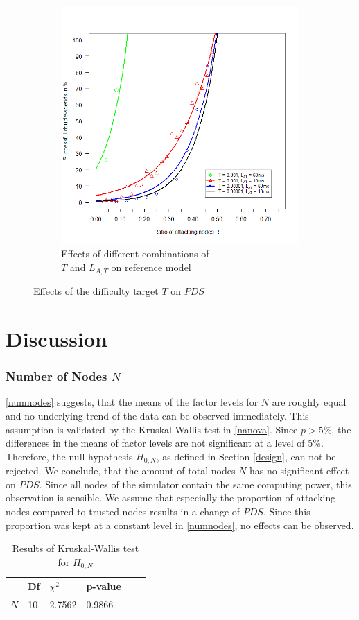 \documentclass[a4paper,12pt,twoside]{report}
\begin{document}
\begin{figure}[hb!]
\begin{subfigure}{.5\textwidth}
  \includegraphics[width=\linewidth]{Experiments/Difficulty/diffrat.png}
  \caption{Effects of different combinations of \\ $T$ and $L_{A,T}$ on reference model}
  \label{diff:b}
\end{subfigure}
\caption{Effects of the difficulty target $T$ on $PDS$}
\label{diff}
\end{figure}

\section{Discussion}
\subsubsection{Number of Nodes $N$}
\autoref{numnodes} suggests, that the means of the factor levels for $N$ are roughly equal and no underlying trend of the data can be observed immediately. This assumption is validated by the Kruskal-Wallis test in \autoref{nanova}. Since $p > 5\%$, the differences in the means of factor levels are not significant at a level of 5\%. Therefore, the null hypothesis $H_{0,N}$, as defined in Section \ref{design}, can not be rejected. We conclude, that the amount of total nodes $N$ has no significant effect on $PDS$. Since all nodes of the simulator contain the same computing power, this observation is sensible. We assume that especially the proportion of attacking nodes compared to trusted nodes results in a change of $PDS$. Since this proportion was kept at a constant level in \autoref{numnodes}, no effects can be observed.
\begin{table}[hb]
\centering
\begin{tabular}{|l|l|l|l|l|l|} \hline
& Df & $\chi^{2}$ & p-value \\ \hline
$N$ & 10 &  2.7562 & 0.9866 \\ \hline
\end{tabular}
\caption{Results of Kruskal-Wallis test for $H_{0,N}$}
\label{nanova}
\end{table}
\end{document}

